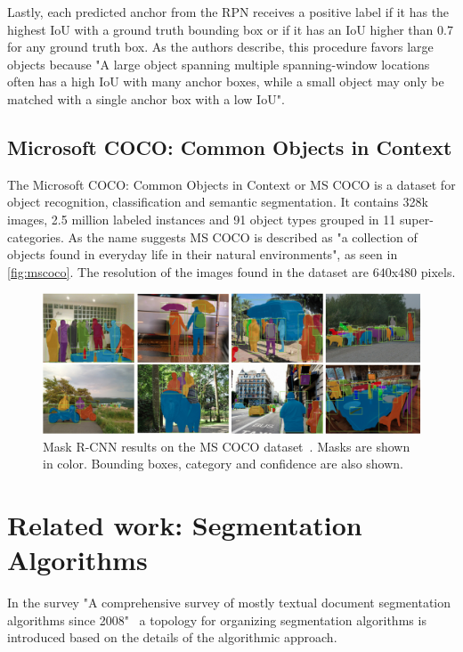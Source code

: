 \documentclass[oneside, english, bibtex]{kththesis}
\begin{document}
Lastly, each predicted anchor from the RPN receives a positive label if it has the highest IoU with a ground truth bounding box or if it has an IoU higher than 0.7 for any ground truth box. As the authors describe, this procedure favors large objects because "A large object spanning multiple spanning-window locations often has a high IoU with many anchor boxes, while a small object may only be matched with a single anchor box with a low IoU".

\subsection{Microsoft COCO: Common Objects in Context}

The Microsoft COCO: Common Objects in Context or MS COCO is a dataset for object recognition, classification and semantic segmentation.
It contains 328k images, 2.5 million labeled instances and 91 object types grouped in 11 super-categories.
As the name suggests MS COCO is described as "a collection of objects found in everyday life in their natural environments", as seen in \autoref{fig:mscoco}.
The resolution of the images found in the dataset are $640$x$480$ pixels.

\begin{figure}[H]
  \begin{center}
    \includegraphics[width=1.0\textwidth]{figures/mscoco.png}
  \end{center}
  \caption{Mask R-CNN results on the MS COCO dataset~\cite{DBLP:journals/corr/HeGDG17}. Masks are shown in color. Bounding boxes, category and confidence are also shown.   }
  \label{fig:mscoco}
\end{figure}


\section{Related work: Segmentation Algorithms}
\label{sec:relwork}

In the survey "A comprehensive survey of mostly textual document segmentation algorithms since 2008"~\cite{ESKENAZI20171} a topology for organizing segmentation algorithms is introduced based on the details of the algorithmic approach.
\end{document}
